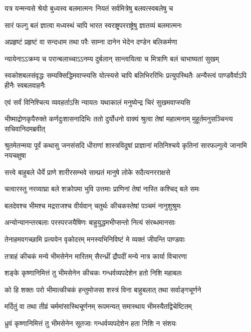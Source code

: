 \twolineshloka
{यत्र यन्मन्यसे श्रेयो बुध्यस्व बलमात्मनः}
{नियतं सर्वमित्रेषु बलवत्स्वबलेषु च}


\twolineshloka
{सारं फल्गु बलं ज्ञात्वा मध्यस्थं चापि भारत}
{स्वराष्ट्रपरराष्ट्रेषु ज्ञातव्यं बलमात्मनः}


\twolineshloka
{अप्रहृष्टं प्रहृष्टं वा सन्दधाम तथा परैः}
{साम्ना दानेन भेदेन दण्डेन बलिकर्मणा}


\twolineshloka
{न्यायेनाऽऽक्रम्य च परान्बलाच्चाऽऽनम्य दुर्बलान्}
{सान्त्वयित्वा च मित्राणि बलं चाभाष्यतां सुखम्}


\threelineshloka
{स्वकोशबलसंवृद्धः सम्यक्सिद्धिमवाप्स्यसि}
{योत्स्यसे चापि बलिभिररिभिः प्रत्युपस्थितैः}
{अन्यैस्त्वं पाण्डवैर्वाऽपि हीनैः स्वबलवाहनैः}


\twolineshloka
{एवं सर्वं विनिश्चित्य व्यवहर्ताऽसि न्यायतः}
{यथाकालं मनुष्येन्द्र चिरं सुखमवाप्स्यसि}


\threelineshloka
{भीष्माद्रोणकृपैरुक्ते कर्णदुःशासनादिभिः}
{ततो दुर्योधनो वाक्यं श्रुत्वा तेषां महात्मनाम्}
{मुहूर्तमनुसञ्चिन्त्य सचिवानिदमब्रवीत्}


\threelineshloka
{श्रुतमेतन्मया पूर्वं कथासु जनसंसदि}
{धीराणां शास्त्रविदुषां प्राज्ञानां मतिनिश्चये}
{कृतिनां सारफल्गुत्वे जानामि नयचक्षुषा}


\twolineshloka
{सत्त्वे बाहुबले धैर्ये प्राणे शारीरसम्भवे}
{साम्प्रतं मानुषे लोके सदैत्यनरराक्षसे}


\twolineshloka
{चत्वारस्तु नरव्याघ्रा बले शक्रोपमा भुवि}
{उत्तमाः प्राणिनां तेषां नास्ति कश्चिद् बले समः}


\twolineshloka
{बलदेवश्च भीमश्च मद्रराजश्च वीर्यवान्}
{चतुर्थः कीचकस्तेषां पञ्चमं नानुशुश्रुमः}


\twolineshloka
{अन्योन्यानन्तरबलाः परस्परजयैषिणः}
{बाहुयुद्धमभीप्सन्तो नित्यं संरब्धमानसाः}


\twolineshloka
{तेनाहमवगच्छामि प्रत्ययेन वृकोदरम्}
{मनस्यभिनिविष्टं मे व्यक्तं जीवन्ति पाण्डवाः}


\twolineshloka
{तत्राहं कीचकं मन्ये भीमसेनेन मारितम्}
{सैरन्ध्रीं द्रौपदीं मन्ये नात्र कार्या विचारणा}


\twolineshloka
{शङ्के कृष्णानिमित्तं तु भीमसेनेन कीचकः}
{गन्धर्वव्यपदेशेन हतो निशि महाबलः}


\twolineshloka
{को हि शक्तः परो भीमात्कीचकं हन्तुमोजसा}
{शस्त्रं विना बाहुबलात् तथा सर्वाङ्गचूर्णने}


\twolineshloka
{मर्दितुं वा तथा तीव्रं चर्ममांसास्थिचूर्णनम्}
{रूपमन्यत् समास्थाय भीमस्यैतद्विचेष्टितम्}


\twolineshloka
{ध्रुवं कृष्णानिमित्तं तु भीमसेनेन सूतजाः}
{गन्धर्वव्यपदेशेन हता निशि न संशयः}


